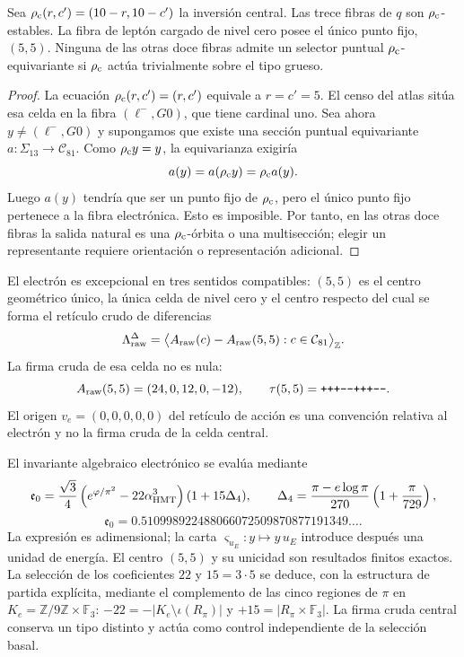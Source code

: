 \begin{theorem}
Sea \(\rho_{\rm c}(r,c')=(10-r,10-c')\) la inversi\'on central. Las trece fibras de
\(q\) son \(\rho_{\rm c}\)-estables. La fibra de lept\'on cargado de nivel cero posee
el \'unico punto fijo, \((5,5)\). Ninguna de las otras doce fibras admite
un selector puntual \(\rho_{\rm c}\)-equivariante si \(\rho_{\rm c}\) act\'ua trivialmente
sobre el tipo grueso.
\end{theorem}
\begin{proof}
La ecuaci\'on \(\rho_{\rm c}(r,c')=(r,c')\) equivale a \(r=c'=5\). El censo del atlas
sit\'ua esa celda en la fibra \((\ell^-,G0)\), que tiene cardinal uno. Sea
ahora \(y\neq(\ell^-,G0)\) y supongamos que existe una secci\'on puntual
equivariante \(a:\Sigma_{13}\to\mathcal C_{81}\). Como \(\rho_{\rm c} y=y\), la
equivarianza exigir\'ia
\[
 a(y)=a(\rho_{\rm c} y)=\rho_{\rm c} a(y).
\]
Luego \(a(y)\) tendr\'ia que ser un punto fijo de \(\rho_{\rm c}\), pero el \'unico
punto fijo pertenece a la fibra electr\'onica. Esto es imposible. Por tanto,
en las otras doce fibras la salida natural es una \(\rho_{\rm c}\)-\'orbita o una
multisecci\'on; elegir un representante requiere orientaci\'on o
representaci\'on adicional.
\end{proof}

El electr\'on es excepcional en tres sentidos compatibles: \((5,5)\) es el
centro geom\'etrico \'unico, la \'unica celda de nivel cero y el centro respecto
del cual se forma el ret\'iculo crudo de diferencias
\[
 \Lambda_{\rm raw}^{\Delta}
 =\bigl\langle A_{\rm raw}(c)-A_{\rm raw}(5,5):
 c\in\mathcal C_{81}\bigr\rangle_{\mathbb Z}.
\]
La firma cruda de esa celda no es nula:
\[
 A_{\rm raw}(5,5)=(24,0,12,0,-12),
 \qquad \tau(5,5)=\texttt{+++---+++---}.
\]
El origen \(v_e=(0,0,0,0,0)\) del ret\'iculo de acci\'on es una convenci\'on
relativa al electr\'on y no la firma cruda de la celda central.

El invariante algebraico electr\'onico se eval\'ua mediante
\[
 \mathfrak e_0=
 \frac{\sqrt3}{4}
 \left(e^{\varphi/\pi^2}-22\alpha_{\rm HMT}^{3}\right)
 (1+15\Delta_4),
 \qquad
 \Delta_4=
 \frac{\pi-e\log\pi}{270}\left(1+\frac{\pi}{729}\right),
\]
\[
 \mathfrak e_0
 =0.510998922488066072509870877191349\ldots.
\]
La expresi\'on es adimensional; la carta
\(\varsigma_{u_E}:y\mapsto y\,u_E\) introduce despu\'es una unidad de energ\'ia.
El centro \((5,5)\) y su unicidad son resultados finitos exactos. La selecci\'on
de los coeficientes \(22\) y \(15=3\cdot5\) se deduce, con la estructura de
partida expl\'icita, mediante el complemento
de las cinco regiones de \(\pi\) en \(K_e=\mathbb Z/9\mathbb Z\times\mathbb F_3\):
\(-22=-|K_e\setminus\iota(R_\pi)|\) y
\(+15=|R_\pi\times\mathbb F_3|\). La firma cruda central conserva un tipo
distinto y act\'ua como control independiente de la selecci\'on basal.

